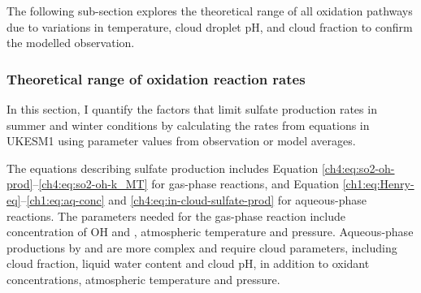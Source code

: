 

The following sub-section explores the theoretical range of all oxidation pathways due to variations in temperature, cloud droplet pH, and cloud fraction to confirm the modelled observation.

\subsubsection{Theoretical range of \texorpdfstring{}{SO2} oxidation reaction rates}

In this section, I quantify the factors that limit sulfate production rates in summer and winter conditions by calculating the rates from equations in UKESM1 using parameter values from observation or model averages. 

The equations describing sulfate production includes Equation \ref{ch4:eq:so2-oh-prod}--\ref{ch4:eq:so2-oh-k_MT} for gas-phase reactions, and Equation \ref{ch1:eq:Henry-eq}--\ref{ch1:eq:aq-conc} and \ref{ch4:eq:in-cloud-sulfate-prod} for aqueous-phase reactions. The parameters needed for the gas-phase reaction include concentration of OH and , atmospheric temperature and pressure. Aqueous-phase productions by  and  are more complex and require cloud parameters, including cloud fraction, liquid water content and cloud pH, in addition to oxidant concentrations, atmospheric temperature and pressure. 


